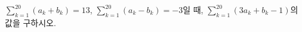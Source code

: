 $\displaystyle\sum_{k=1}^{20} (a_k+b_k)=13$, $\displaystyle\sum_{k=1}^{20} (a_k-b_k)=-3$일 때, $\displaystyle\sum_{k=1}^{20} (3a_k+b_k-1)$의 값을 구하시오.
